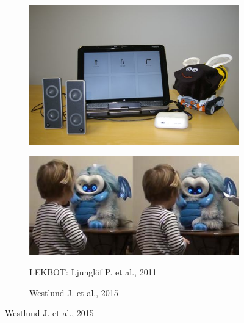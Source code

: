 \documentclass[a4paper,twoside]{book}
\begin{document}
\begin{figure}[h]
 
\begin{subfigure}[b]{\textwidth/2}
\includegraphics[width=\textwidth]{img/Ljunglof} 
\end{subfigure}
\begin{subfigure}[b]{\textwidth/2}
\includegraphics[width=\textwidth]{img/Westlund}
\end{subfigure}

\begin{subfigure}[t]{\textwidth/2}
\caption{LEKBOT: Ljungl\"of P. et al., 2011}
\end{subfigure}
\begin{subfigure}[t]{\textwidth/2}
\caption{Westlund J. et al., 2015}
\end{subfigure}


\end{figure}
\end{document}
